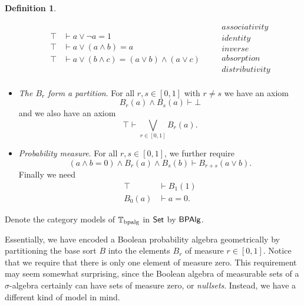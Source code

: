 \documentclass[a4paper]{amsproc}
\theoremstyle{plain}
\theoremstyle{definition}
\newtheorem{definition}[theorem]{Definition}
\theoremstyle{remark}
\numberwithin{equation}{section}
\newcommand{\Set}{\textup{\textsf{Set}}}
\newcommand{\BPAlg}{\textup{\textsf{BPAlg}}}
\begin{document}
\begin{definition}
\begin{itemize}
\begin{equation*}
\begin{split}
                \top &\vdash a \vee \neg{a} = 1 \\
                \top &\vdash a \vee (a \wedge b) = a \\
                \top &\vdash a \vee (b \wedge c) = (a \vee b) \wedge (a \vee c) \\
            \end{split}
            \quad
            \begin{split}
                &\textit{associativity} \\
                &\textit{identity} \\
                &\textit{inverse} \\
                &\textit{absorption} \\
                &\textit{distributivity} \\
            \end{split}
        \end{equation*}
        \item \textit{The $B_r$ form a partition}. For all $r, s \in [0,1]$ with $r \neq s$ we have an axiom
        \[
        B_r(a)  \wedge B_s(a) \vdash \bot
        \]
        and we also have an axiom
        \[
        \top \vdash \bigvee_{r \in [0,1]} B_r(a).
        \]
        \item \textit{Probability measure}. For all $r, s \in [0,1]$, we further require
        \[
        (a \wedge b = 0) \wedge B_r(a) \wedge B_s(b) \vdash B_{r+s}(a \vee b) .
        \]
        Finally we need
        \begin{align*}
            \top & \vdash B_1(1) \\
            B_0(a) & \vdash a = 0.
        \end{align*}
    \end{itemize}
    Denote the category models of $\mathbb{T}_{\textup{bpalg}}$ in $\Set$ by $\BPAlg$.
\end{definition}

Essentially, we have encoded a Boolean probability algebra geometrically by partitioning the base sort $B$ into the elements $B_r$ of measure $r \in [0,1]$. Notice that we require that there is only one element of measure zero. This requirement may seem somewhat surprising, since the Boolean algebra of measurable sets of a $\sigma$-algebra certainly can have sets of measure zero, or \emph{nullsets}. Instead, we have a different kind of model in mind.
\end{document}
